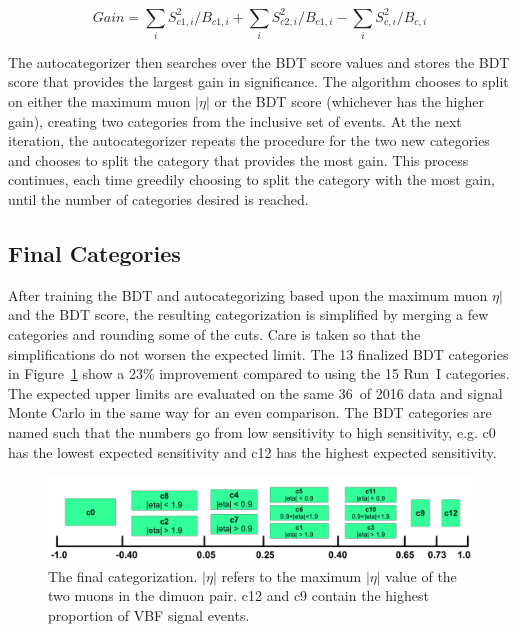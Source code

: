\begin{equation}
Gain = \sum_{i}S_{c1,i}^{2}/B_{c1,i} + \sum_{i}S_{c2,i}^{2}/B_{c1,i} - \sum_{i}S_{c,i}^{2}/B_{c,i}
\end{equation}

The autocategorizer then searches over the BDT score values and stores the BDT score that provides the largest gain in significance.
The algorithm chooses to split on either the maximum muon $|\eta|$ or the BDT score (whichever has the higher gain), creating two
categories from the inclusive set of events. At the next iteration, the autocategorizer repeats the procedure for the two new
categories and chooses to split the category that provides the most gain. This process continues, each time greedily choosing to
split the category with the most gain, until the number of categories desired is reached.


\subsection{Final Categories}

After training the BDT and autocategorizing based upon the maximum muon $\eta|$ and the BDT score, the resulting categorization is
simplified by merging a few categories and rounding some of the cuts. Care is taken so that the simplifications do not worsen the
expected limit. The 13 finalized BDT categories in Figure~\ref{fig:final_categories} show a 23\% improvement compared to using the
15 Run~I \Htomm categories. The expected upper limits are evaluated on the same 36~\invfb of 2016 data and signal Monte Carlo in the
same way for an even comparison. The BDT categories are named such that the numbers go from low sensitivity to high sensitivity, e.g.
c0 has the lowest expected sensitivity and c12 has the highest expected sensitivity.

\begin{figure}[hbp]
  \centering
  \includegraphics[width=1.0\linewidth]{figures/bdt_cats/final_categories.png}
  \caption
   {The final categorization. $|\eta|$ refers to the maximum $|\eta|$ value of the two muons in the dimuon pair. c12 and c9
    contain the highest proportion of VBF signal events.}
  \label{fig:final_categories}
\end{figure}

